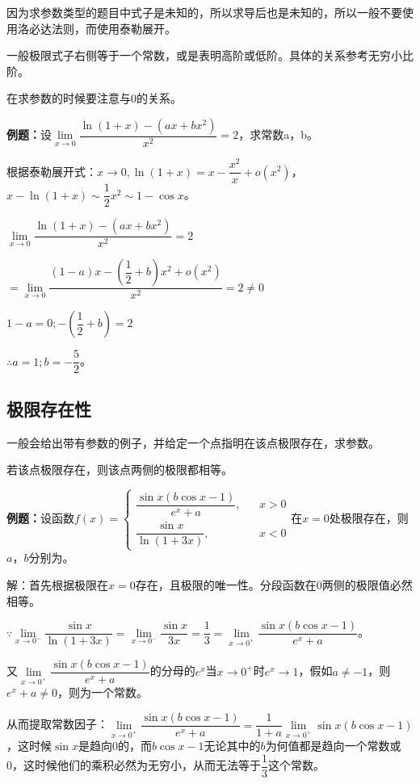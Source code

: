 \documentclass[UTF8, 12pt]{ctexart}
\begin{document}
因为求参数类型的题目中式子是未知的，所以求导后也是未知的，所以一般不要使用洛必达法则，而使用泰勒展开。

一般极限式子右侧等于一个常数，或是表明高阶或低阶。具体的关系参考无穷小比阶。

在求参数的时候要注意与0的关系。\medskip

\textbf{例题：}设$\lim\limits_{x\to 0}\dfrac{\ln(1+x)-(ax+bx^2)}{x^2}=2$，求常数a，b。

根据泰勒展开式：$x\to 0,\ln(1+x)=x-\dfrac{x^2}{x}+o(x^2)$，$x-\ln(1+x)\sim\dfrac{1}{2}x^2\sim 1-\cos x$。

$\lim\limits_{x\to 0}\dfrac{\ln(1+x)-(ax+bx^2)}{x^2}=2$

$=\lim\limits_{x\to 0}\dfrac{(1-a)x-\left(\dfrac{1}{2}+b\right)x^2+o(x^2)}{x^2}=2\neq 0$

$1-a=0;-\left(\dfrac{1}{2}+b\right)=2$\medskip

$\therefore a=1;b=-\dfrac{5}{2}$。

\subsection{极限存在性}

一般会给出带有参数的例子，并给定一个点指明在该点极限存在，求参数。

若该点极限存在，则该点两侧的极限都相等。\medskip

\textbf{例题：}设函数$f(x)=\left\{\begin{array}{lcl}
    \dfrac{\sin x(b\cos x-1)}{e^x+a}, & & x>0 \\
    \dfrac{\sin x}{\ln(1+3x)}, & & x<0
\end{array}
\right.$在$x=0$处极限存在，则$a$，$b$分别为。

解：首先根据极限在$x=0$存在，且极限的唯一性。分段函数在0两侧的极限值必然相等。

$\because\lim\limits_{x\to 0^-}\dfrac{\sin x}{\ln(1+3x)}=\lim\limits_{x\to 0^-}\dfrac{\sin x}{3x}=\dfrac{1}{3}=\lim\limits_{x\to 0^+}\dfrac{\sin x(b\cos x-1)}{e^x+a}$。

\medskip

又$\lim\limits_{x\to 0^+}\dfrac{\sin x(b\cos x-1)}{e^x+a}$的分母的$e^x$当$x\to 0^+$时$e^x\to 1$，假如$a\neq-1$，则$e^x+a\neq 0$，则为一个常数。

从而提取常数因子：$\lim\limits_{x\to 0^+}\dfrac{\sin x(b\cos x-1)}{e^x+a}=\dfrac{1}{1+a}\lim\limits_{x\to 0^+}\sin x(b\cos x-1)$，这时候$\sin x$是趋向0的，而$b\cos x-1$无论其中的$b$为何值都是趋向一个常数或0，这时候他们的乘积必然为无穷小，从而无法等于$\dfrac{1}{3}$这个常数。
\end{document}
